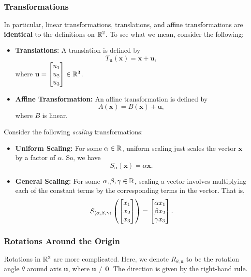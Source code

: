 \documentclass[letterpaper]{article}
\begin{document}
\subsubsection{Transformations}
In particular, linear transformations, translations, and affine transformations are \textbf{identical} to the definitions on $\mathbb{R}^2$. To see what we mean, consider the following:
\begin{itemize}
    \item \textbf{Translations:} A translation is defined by 
    \[T_{\mathbf{u}}(\mathbf{x}) = \mathbf{x} + \mathbf{u},\]
    where $\mathbf{u} = \begin{bmatrix}
        u_1 \\ u_2 \\ u_3
    \end{bmatrix} \in \mathbb{R}^3$. 

    \item \textbf{Affine Transformation:} An affine transformation is defined by 
    \[A(\mathbf{x}) = B(\mathbf{x}) + \mathbf{u},\]
    where $B$ is linear. 
\end{itemize}
Consider the following \emph{scaling} transformations: 
\begin{itemize}
    \item \textbf{Uniform Scaling:} For some $\alpha \in \mathbb{R}$, uniform scaling just scales the vector $\mathbf{x}$ by a factor of $\alpha$. So, we have 
    \[S_{\alpha}(\mathbf{x}) = \alpha \mathbf{x}.\]

    \item \textbf{General Scaling:} For some $\alpha, \beta, \gamma \in \mathbb{R}$, scaling a vector involves multiplying each of the constant terms by the corresponding terms in the vector. That is, 
    \[S_{\langle \alpha, \beta, \gamma \rangle}\left(\begin{bmatrix}
        x_1 \\ x_2 \\ x_3
    \end{bmatrix}\right) = \begin{bmatrix}
        \alpha x_1 \\ 
        \beta x_2 \\ 
        \gamma x_3
    \end{bmatrix}.\]
\end{itemize}

\subsubsection{Rotations Around the Origin}
Rotations in $\mathbb{R}^3$ are more complicated. Here, we denote $R_{\theta, \mathbf{u}}$ to be the rotation angle $\theta$ around axis $\mathbf{u}$, where $\mathbf{u} \neq \mathbf{0}$. The direction is given by the right-hand rule. 
\end{document}
